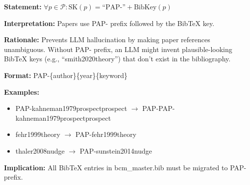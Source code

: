 \begin{tcolorbox}[colback=gray!5!white, colframe=gray!75!black,
    title=Axiom SK-9: Paper Exception]
\textbf{Statement:} $\forall p \in \mathcal{P}: \text{SK}(p) = \text{``PAP-''} + \text{BibKey}(p)$

\textbf{Interpretation:} Papers use PAP- prefix followed by the BibTeX key.

\textbf{Rationale:} Prevents LLM hallucination by making paper references unambiguous.
Without PAP- prefix, an LLM might invent plausible-looking BibTeX keys (e.g.,
``smith2020theory'') that don't exist in the bibliography.

\textbf{Format:} PAP-\{author\}\{year\}\{keyword\}

\textbf{Examples:}
\begin{itemize}[nosep]
\item PAP-kahneman1979prospectprospect $\rightarrow$ PAP-PAP-kahneman1979prospectprospect
\item fehr1999theory $\rightarrow$ PAP-fehr1999theory
\item thaler2008nudge $\rightarrow$ PAP-sunstein2014nudge
\end{itemize}

\textbf{Implication:} All BibTeX entries in bcm\_master.bib must be migrated to PAP- prefix.
\end{tcolorbox}

